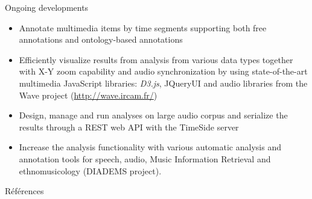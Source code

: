 \documentclass[final, hyperref, table]{beamer}
\begin{document}
\begin{frame}[containsverbatim]{}
\begin{columns}[T]
\begin{column}[T]{.49\linewidth}
  \begin{block}{Ongoing developments}
\vspace{-1cm}
    \begin{multicols}{2}[]
        \begin{itemize}
        \item \alert{Annotate} multimedia items by time segments supporting both free annotations and ontology-based annotations
        \item Efficiently \alert{visualize} results from analysis from various data types together with X-Y zoom capability and audio synchronization by using state-of-the-art multimedia JavaScript libraries: \emph{D3.js}, JQueryUI and audio libraries from the Wave project (\url{http://wave.ircam.fr/})
        \item Design, manage and run analyses on large audio corpus and serialize the results through a REST web API with the TimeSide server
        \item Increase the analysis functionality with various automatic analysis and annotation tools for speech, audio, Music Information Retrieval and ethnomusicology (DIADEMS project).

\end{itemize}
\end{multicols}
\end{block}

\begin{block}{Références}\tiny

\vspace{-1cm}
\begin{multicols}{2}[]

\end{multicols}
\end{block}
  
\end{column}
\end{columns}
\end{frame}
\end{document}
